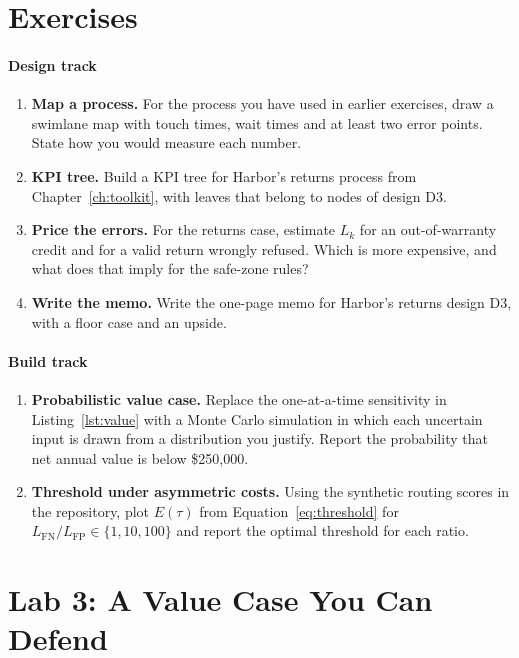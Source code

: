 \section*{Exercises}

\paragraph{Design track}
\begin{enumerate}[itemsep=2pt]
  \item \textbf{Map a process.} For the process you have used in earlier exercises, draw a swimlane map with touch times, wait times and at least two error points. State how you would measure each number.
  \item \textbf{KPI tree.} Build a KPI tree for Harbor's returns process from Chapter~\ref{ch:toolkit}, with leaves that belong to nodes of design D3.
  \item \textbf{Price the errors.} For the returns case, estimate $L_k$ for an out-of-warranty credit and for a valid return wrongly refused. Which is more expensive, and what does that imply for the safe-zone rules?
  \item \textbf{Write the memo.} Write the one-page memo for Harbor's returns design D3, with a floor case and an upside.
\end{enumerate}

\paragraph{Build track}
\begin{enumerate}[resume, itemsep=2pt]
  \item \textbf{Probabilistic value case.} Replace the one-at-a-time sensitivity in Listing~\ref{lst:value} with a Monte Carlo simulation in which each uncertain input is drawn from a distribution you justify. Report the probability that net annual value is below \$250{,}000.
  \item \textbf{Threshold under asymmetric costs.} Using the synthetic routing scores in the repository, plot $E(\tau)$ from Equation~\eqref{eq:threshold} for $L_{\text{FN}}/L_{\text{FP}} \in \{1, 10, 100\}$ and report the optimal threshold for each ratio.
\end{enumerate}

\section*{Lab 3: A Value Case You Can Defend}

